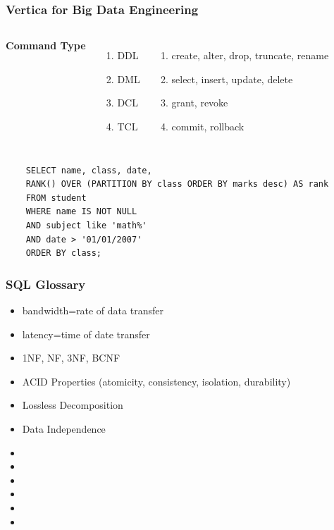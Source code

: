 \documentclass{beamer}
\begin{document}
\begin{frame}[fragile] %
\frametitle{Vertica for Big Data Engineering}

\begin{columns}[c] %
	
	\textbf{Command Type}
	\begin{enumerate}
		\item DDL
		\item DML
		\item DCL
		\item TCL
	\end{enumerate}
	
	\begin{enumerate}
		\item create, alter, drop, truncate, rename
		\item select, insert, update, delete
		\item grant, revoke
		\item commit, rollback
	\end{enumerate}
	
\end{columns}


\begin{example}
	\begin{verbatim}
	SELECT name, class, date, 
	RANK() OVER (PARTITION BY class ORDER BY marks desc) AS rank 
	FROM student 
	WHERE name IS NOT NULL 
	AND subject like 'math%' 
	AND date > '01/01/2007' 
	ORDER BY class;
	\end{verbatim}
\end{example}


\end{frame}


\begin{frame}
\frametitle{SQL Glossary}
\begin{itemize}
	\item bandwidth=rate of data transfer
	\item latency=time of date transfer
	\item 1NF, NF, 3NF, BCNF
	\item ACID Properties (atomicity, consistency, isolation, durability)
	\item Lossless Decomposition
	\item Data Independence
	\item 
	\item 
	\item 
	\item 
	\item 
	\item 
\end{itemize}
\end{frame}
\end{document}
